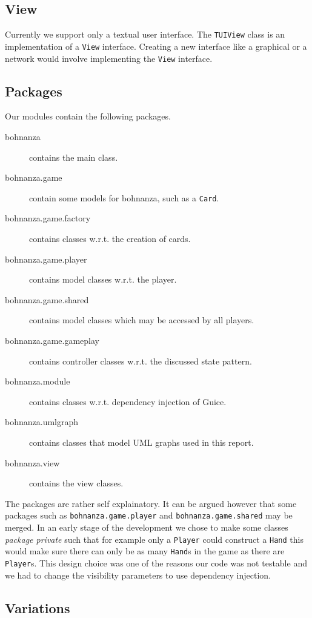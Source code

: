 \subsection{View}
Currently we support only a textual user interface. The \texttt{TUIView} class is an implementation
of a \texttt{View} interface. Creating a new interface like a graphical or a network would involve
implementing the \texttt{View} interface.

\subsection{Packages}
Our modules contain the following packages.
\begin{description}
\item[bohnanza] contains the main class.
\item[bohnanza.game] contain some models for bohnanza, such as a \texttt{Card}.
\item[bohnanza.game.factory] contains classes w.r.t. the creation of cards.
\item[bohnanza.game.player] contains model classes w.r.t. the player.
\item[bohnanza.game.shared] contains model classes which may be accessed by all players.
\item[bohnanza.game.gameplay] contains controller classes w.r.t. the discussed state pattern.
\item[bohnanza.module] contains classes w.r.t. dependency injection of Guice.
\item[bohnanza.umlgraph] contains classes that model UML graphs used in this report.
\item[bohnanza.view] contains the view classes.
\end{description}

The packages are rather self explainatory. It can be argued however that some packages such as \texttt{bohnanza.game.player} and
\texttt{bohnanza.game.shared} may be merged. In an early stage of the development we chose to make some classes \emph{package private} such
that for example only a \texttt{Player} could construct a \texttt{Hand} this would make sure there can only be as many \texttt{Hand}s in the
game as there are \texttt{Player}s. This design choice was one of the reasons our code was not testable and we had to change the visibility
parameters to use dependency injection.

\subsection{Variations}

